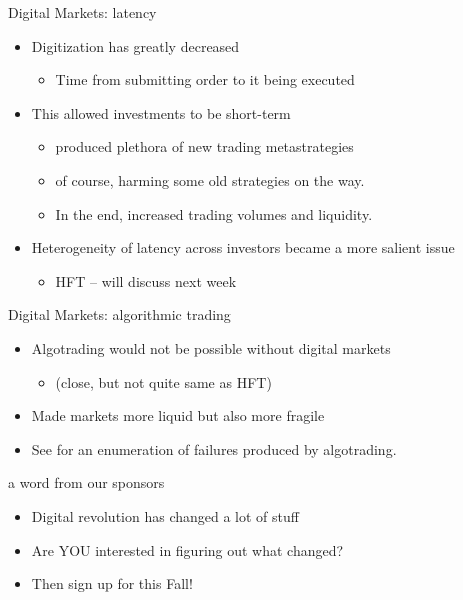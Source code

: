 \documentclass[english,10pt
,aspectratio=169
]{beamer}
\begin{document}
\begin{frame}{Digital Markets: latency}
	\begin{itemize}
		\item Digitization has greatly decreased 
		\begin{itemize}
			\item Time from submitting order to it being executed
		\end{itemize}
		\item This allowed investments to be short-term
		\begin{itemize}
			\item produced plethora of new trading metastrategies
			\item of course, harming some old strategies on the way.
			\item In the end, increased trading volumes and liquidity.
		\end{itemize}
		\item Heterogeneity of latency across investors became a more salient issue
		\begin{itemize}
			\item HFT -- will discuss next week
		\end{itemize}
	\end{itemize}
\end{frame}


\begin{frame}{Digital Markets: algorithmic trading}
	\begin{itemize}
		\item Algotrading would not be possible without digital markets
		\begin{itemize}
			\item (close, but not quite same as HFT)
		\end{itemize}
		\item Made markets more liquid but also more fragile
		\item See \cite{kirilenko_moores_2013} for an enumeration of failures produced by algotrading.
	\end{itemize}
\end{frame}


\begin{frame}{a word from our sponsors}
	\begin{itemize}
		\item Digital revolution has changed a lot of stuff
		\item Are YOU interested in figuring out what changed?
		\item Then sign up for  this Fall!
	\end{itemize}
\end{frame}
\end{document}
